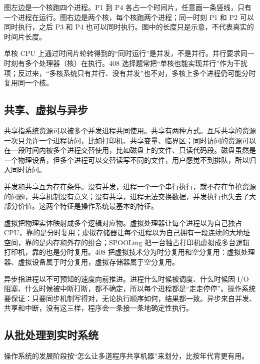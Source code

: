 图左边是一个核跑四个进程。P1 到 P4 各占一个时间片，任意画一条竖线，只有一个进程在运行。图右边是两个核，每个核跑两个进程；同一时刻 P1 和 P2 可以同时执行，之后 P3 和 P4 也可以同时执行。图中的长度只是示意，不代表真实的时间片长度。

\begin{attention}
单核 CPU 上通过时间片轮转得到的“同时运行”是并发，不是并行。并行要求同一时刻有多个处理器（核）在执行。408 选择题常把“单核也能实现并行”作为干扰项；反过来，“多核系统只有并行、没有并发”也不对，多核上多个进程仍可能分时复用同一个核。
\end{attention}

\subsection{共享、虚拟与异步}

共享指系统资源可以被多个并发进程共同使用。共享有两种方式。互斥共享的资源一次只允许一个进程访问，比如打印机、共享变量、临界区；同时访问的资源可以在一段时间内被多个进程交替使用，比如磁盘上的文件、只读代码段。磁盘虽然是一个物理设备，但多个进程可以交替读写不同的文件，用户感觉不到排队，所以归入同时访问。

并发和共享互为存在条件。没有并发，进程一个一个串行执行，就不存在争抢资源的问题，共享机制没有意义；没有共享，进程无法交换数据，并发执行也失去了大部分价值。这两个特征是操作系统最基本的特征。

虚拟把物理实体映射成多个逻辑对应物。虚拟处理器让每个进程以为自己独占 CPU，靠的是分时复用；虚拟存储器让每个进程以为自己拥有一段连续的大地址空间，靠的是内存和外存的组合；SPOOLing 把一台独占打印机虚拟成多台逻辑打印机，靠的也是分时复用。408 把虚拟技术分为时分复用和空分复用：虚拟处理器、虚拟设备属于时分复用，虚拟存储器属于空分复用。

异步指进程以不可预知的速度向前推进。进程什么时候被调度、什么时候因 I/O 阻塞、什么时候被中断打断，都不确定，所以每个进程都是“走走停停”。操作系统要保证：只要同步机制写得对，无论执行顺序如何，结果都一致。异步来自并发、共享和中断，没有这三样，程序会一条接一条地确定性执行。

\subsection{从批处理到实时系统}

操作系统的发展阶段按“怎么让多道程序共享机器”来划分，比按年代背更有用。

